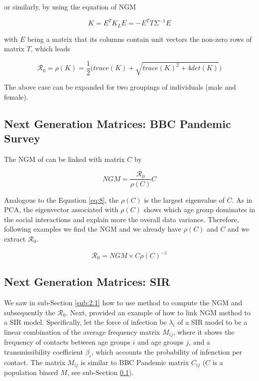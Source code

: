 \documentclass[12pt]{article}
\begin{document}
or similarly, by using the equation of NGM

\begin{equation}
K=E^{T}K_{L}E=-E^{T}T\Sigma^{-1}E
\end{equation}

with $E$ being a matrix that its columns contain unit vectors the non-zero rows of matrix $T$, which leads

\begin{equation}
\mathcal{R}_{0}  = \rho (K) = \frac{1}{2} \bigg( trace(K) + \sqrt{trace(K)^{2} + 4det(K)} \bigg)
\label{eq:8}
\end{equation}

The above case can be expanded for two groupings of individuals (male and female).

\subsection{Next Generation Matrices: BBC Pandemic Survey}
\label{sub:2.2}

The NGM of \cite{Diekmann:2010} can be linked with \cite{Klepac2020} matrix $C$ by 

\begin{equation}
NGM  = \frac{\mathcal{R}_{0}}{\rho(C)} C
\end{equation}

Analogous to the Equation \ref{eq:8}, the $\rho(C)$ is the largest eigenvalue of $C$. As in PCA, the eigenvector associated with $\rho(C)$ shows which age group dominates in the social interactions and explain more the overall data variance. Therefore, following \cite{Diekmann:2010} examples we find the NGM and we already have $\rho(C)$ and $C$ and we extract $\mathcal{R}_{0}$.

\begin{equation}
\mathcal{R}_{0} = NGM \times C \rho(C)^{-1}
\label{eq:9}
\end{equation}

\subsection{Next Generation Matrices: SIR}
\label{sub:2.3}

We saw in sub-Section \ref{sub:2.1} how to use \cite{Diekmann:2010} method to compute the NGM and subsequently the $\mathcal{R}_{0}$. Next, \cite[p.4]{Fumanelli:2012} provided an example of how to link \cite{Diekmann:2010} NGM method to a SIR model. Specifically, let the force of infection be $\lambda_{i}$ of a SIR model to be a linear combination of the average frequency matrix $M_{ij}$, where it shows the frequency of contacts between age groups $i$ and age groups $j$, and a  transmissibility coefficient $\beta_{i}$, which accounts the probability of infenction per contact. The matrix $M_{ij}$ is similar to BBC Pandemic \cite{Klepac2020} matrix $C_{ij}$ ($C$ is a population biased $M$, see sub-Section \ref{sub:2.2}). 
\end{document}
